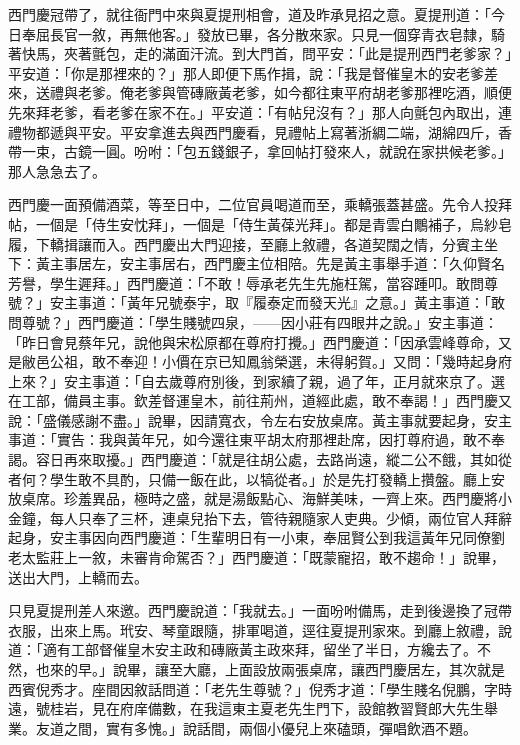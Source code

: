 西門慶冠帶了，就往衙門中來與夏提刑相會，道及昨承見招之意。夏提刑道：「今日奉屈長官一敘，再無他客。」發放已畢，各分散來家。只見一個穿青衣皂隸，騎著快馬，夾著氈包，走的滿面汗流。到大門首，問平安：「此是提刑西門老爹家？」平安道：「你是那裡來的？」那人即便下馬作揖，說：「我是督催皇木的安老爹差來，送禮與老爹。俺老爹與管磚廠黃老爹，如今都往東平府胡老爹那裡吃酒，順便先來拜老爹，看老爹在家不在。」平安道：「有帖兒沒有？」那人向氈包內取出，連禮物都遞與平安。平安拿進去與西門慶看，見禮帖上寫著浙綢二端，湖綿四斤，香帶一束，古鏡一圓。吩咐：「包五錢銀子，拿回帖打發來人，就說在家拱候老爹。」那人急急去了。

西門慶一面預備酒菜，等至日中，二位官員喝道而至，乘轎張蓋甚盛。先令人投拜帖，一個是「侍生安忱拜」，一個是「侍生黃葆光拜」。都是青雲白鷳補子，烏紗皂履，下轎揖讓而入。西門慶出大門迎接，至廳上敘禮，各道契闊之情，分賓主坐下：黃主事居左，安主事居右，西門慶主位相陪。先是黃主事舉手道：「久仰賢名芳譽，學生遲拜。」西門慶道：「不敢！辱承老先生先施枉駕，當容踵叩。敢問尊號？」安主事道：「黃年兄號泰宇，取『履泰定而發天光』之意。」黃主事道：「敢問尊號？」西門慶道：「學生賤號四泉，——因小莊有四眼井之說。」安主事道：「昨日會見蔡年兄，說他與宋松原都在尊府打攪。」西門慶道：「因承雲峰尊命，又是敝邑公祖，敢不奉迎！小價在京已知鳳翁榮選，未得躬賀。」又問：「幾時起身府上來？」安主事道：「自去歲尊府別後，到家續了親，過了年，正月就來京了。選在工部，備員主事。欽差督運皇木，前往荊州，道經此處，敢不奉謁！」西門慶又說：「盛儀感謝不盡。」說畢，因請寬衣，令左右安放桌席。黃主事就要起身，安主事道：「實告：我與黃年兄，如今還往東平胡太府那裡赴席，因打尊府過，敢不奉謁。容日再來取擾。」西門慶道：「就是往胡公處，去路尚遠，縱二公不餓，其如從者何？學生敢不具酌，只備一飯在此，以犒從者。」於是先打發轎上攢盤。廳上安放桌席。珍羞異品，極時之盛，就是湯飯點心、海鮮美味，一齊上來。西門慶將小金鐘，每人只奉了三杯，連桌兒抬下去，管待親隨家人吏典。少傾，兩位官人拜辭起身，安主事因向西門慶道：「生輩明日有一小東，奉屈賢公到我這黃年兄同僚劉老太監莊上一敘，未審肯命駕否？」西門慶道：「既蒙寵招，敢不趨命！」說畢，送出大門，上轎而去。

只見夏提刑差人來邀。西門慶說道：「我就去。」一面吩咐備馬，走到後邊換了冠帶衣服，出來上馬。玳安、琴童跟隨，排軍喝道，逕往夏提刑家來。到廳上敘禮，說道：「適有工部督催皇木安主政和磚廠黃主政來拜，留坐了半日，方纔去了。不然，也來的早。」說畢，讓至大廳，上面設放兩張桌席，讓西門慶居左，其次就是西賓倪秀才。座間因敘話問道：「老先生尊號？」倪秀才道：「學生賤名倪鵬，字時遠，號桂岩，見在府庠備數，在我這東主夏老先生門下，設館教習賢郎大先生舉業。友道之間，實有多愧。」說話間，兩個小優兒上來磕頭，彈唱飲酒不題。

